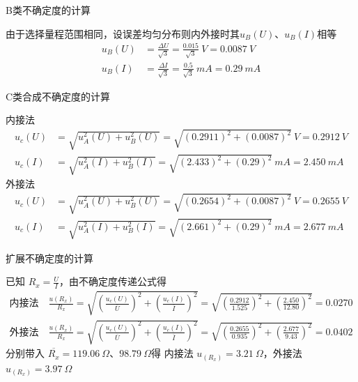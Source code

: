 \documentclass[UTF8]{ctexart}
\begin{document}
B类不确定度的计算

由于选择量程范围相同，设误差均匀分布则内外接时其$u_B(U)$、$u_B(I)$相等
\begin{align*}
    u_B(U) &= \frac{\Delta U}{\sqrt{3}} = \frac{0.015}{\sqrt{3}} \ V = 0.0087 \ V \\
    u_B(I) &= \frac{\Delta I}{\sqrt{3}} = \frac{0.5}{\sqrt{3}} \ mA = 0.29 \ mA
\end{align*}

C类合成不确定度的计算

内接法
\begin{align*}
    u_c(U) &= \sqrt{u^2_A(U) + u^2_B(U)} = \sqrt{(0.2911)^2 + (0.0087)^2} \ V = 0.2912 \ V \\
     u_c(I) &= \sqrt{u^2_A(I) + u^2_B(I)} = \sqrt{(2.433)^2 + (0.29)^2} \ mA = 2.450 \ mA 
\end{align*}
外接法
\begin{align*}
    u_c(U) &= \sqrt{u^2_A(U) + u^2_B(U)} = \sqrt{(0.2654)^2 + (0.0087)^2} \ V = 0.2655\ V \\
     u_c(I) &= \sqrt{u^2_A(I) + u^2_B(I)} = \sqrt{(2.661)^2 + (0.29)^2} \ mA = 2.677 \ mA 
\end{align*}

扩展不确定度的计算

已知 $R_x = \frac{U}{I}$，由不确定度传递公式得
\begin{align*}
  \text{内接法} \quad \frac{u(R_x)}{R_x} &= \sqrt{(\frac{u_c(U)}{\overline{U}})^2 + (\frac{u_c(I)}{\overline{I}})^2} = \sqrt{(\frac{0.2912}{1.525})^2 + (\frac{2.450}{12.80})^2 } = 0.0270 \\
  \text{外接法} \quad \frac{u(R_x)}{R_x} &= \sqrt{(\frac{u_c(U)}{\overline{U}})^2 + (\frac{u_c(I)}{\overline{I}})^2} = \sqrt{(\frac{0.2655}{0.935})^2 + (\frac{2.677}{9.43})^2 } = 0.0402   %
\end{align*}
分别带入 $\overline{R_x} = 119.06 \ \Omega$、$98.79 \ \Omega$得
内接法 $u_(R_x) =  3.21 \ \Omega $，外接法$u_(R_x) = 3.97 \ \Omega $
\end{document}
